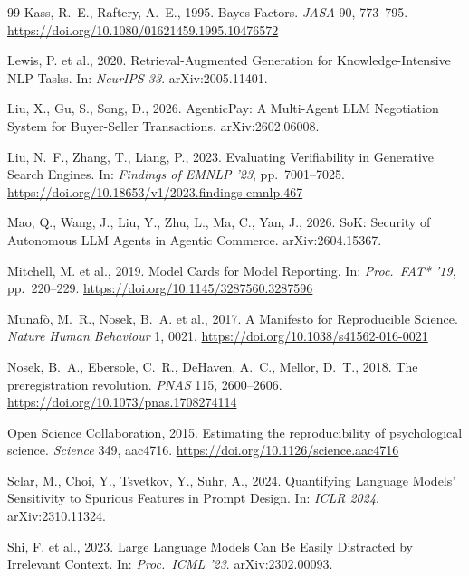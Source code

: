 \documentclass[preprint,12pt,authoryear]{elsarticle}
\begin{document}
\begin{thebibliography}{99}
Kass, R.~E., Raftery, A.~E., 1995. Bayes Factors. \textit{JASA} 90, 773--795. \url{https://doi.org/10.1080/01621459.1995.10476572}

Lewis, P. et al., 2020. Retrieval-Augmented Generation for Knowledge-Intensive NLP Tasks. In: \textit{NeurIPS 33}. arXiv:2005.11401.

Liu, X., Gu, S., Song, D., 2026. AgenticPay: A Multi-Agent LLM Negotiation System for Buyer-Seller Transactions. arXiv:2602.06008.

Liu, N.~F., Zhang, T., Liang, P., 2023. Evaluating Verifiability in Generative Search Engines. In: \textit{Findings of EMNLP '23}, pp.~7001--7025. \url{https://doi.org/10.18653/v1/2023.findings-emnlp.467}

Mao, Q., Wang, J., Liu, Y., Zhu, L., Ma, C., Yan, J., 2026. SoK: Security of Autonomous LLM Agents in Agentic Commerce. arXiv:2604.15367.

Mitchell, M. et al., 2019. Model Cards for Model Reporting. In: \textit{Proc.\ FAT* '19}, pp.~220--229. \url{https://doi.org/10.1145/3287560.3287596}

Munaf\`o, M.~R., Nosek, B.~A. et al., 2017. A Manifesto for Reproducible Science. \textit{Nature Human Behaviour} 1, 0021. \url{https://doi.org/10.1038/s41562-016-0021}

Nosek, B.~A., Ebersole, C.~R., DeHaven, A.~C., Mellor, D.~T., 2018. The preregistration revolution. \textit{PNAS} 115, 2600--2606. \url{https://doi.org/10.1073/pnas.1708274114}

Open Science Collaboration, 2015. Estimating the reproducibility of psychological science. \textit{Science} 349, aac4716. \url{https://doi.org/10.1126/science.aac4716}

Sclar, M., Choi, Y., Tsvetkov, Y., Suhr, A., 2024. Quantifying Language Models' Sensitivity to Spurious Features in Prompt Design. In: \textit{ICLR 2024}. arXiv:2310.11324.

Shi, F. et al., 2023. Large Language Models Can Be Easily Distracted by Irrelevant Context. In: \textit{Proc.\ ICML '23}. arXiv:2302.00093.


\end{thebibliography}
\end{document}
